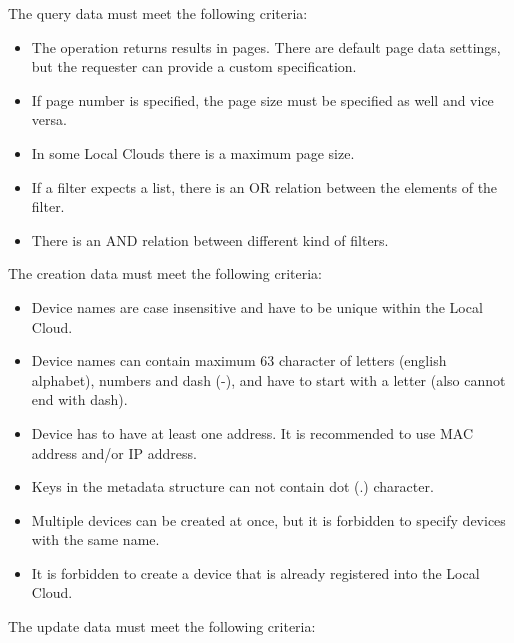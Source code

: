 \documentclass[a4paper]{arrowhead}
\begin{document}
{}

The query data must meet the following criteria:

\begin{itemize}
    \item The operation returns results in pages. There are default page data settings, but the requester can provide a custom specification.
    \item If page number is specified, the page size must be specified as well and vice versa.
    \item In some Local Clouds there is a maximum page size.
    \item If a filter expects a list, there is an OR relation between the elements of the filter.
    \item There is an AND relation between different kind of filters.
\end{itemize}


The creation data must meet the following criteria:

\begin{itemize}
    \item Device names are case insensitive and have to be unique within the Local Cloud.
    \item Device names can contain maximum 63 character of letters (english alphabet), numbers and dash (-), and have to start with a letter (also cannot end with dash).
    \item Device has to have at least one address. It is recommended to use MAC address and/or IP address.
    \item Keys in the metadata structure can not contain dot (.) character.
    \item Multiple devices can be created at once, but it is forbidden to specify devices with the same name.
    \item It is forbidden to create a device that is already registered into the Local Cloud.
\end{itemize}


The update data must meet the following criteria:
\end{document}
